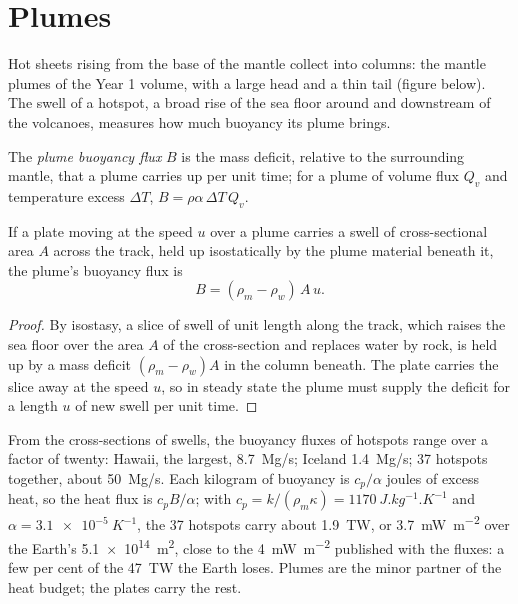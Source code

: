 \section{Plumes}

Hot sheets rising from the base of the mantle collect into columns: the mantle
plumes of the Year 1 volume, with a large head and a thin tail (figure below).
The swell of a hotspot, a broad rise of the sea floor around and downstream of
the volcanoes, measures how much buoyancy its plume brings.

\begin{definition}\label{def:b3:mantle-convection:buoyancy-flux}
The \emph{plume buoyancy flux} $B$ is the mass
deficit, relative to the surrounding mantle, that a plume carries up per unit
time; for a plume of volume flux $Q_v$ and temperature excess $\Delta T$,
$B = \rho\alpha\,\Delta T\,Q_v$.
\end{definition}

\begin{proposition}\label{prop:b3:mantle-convection:swell}
If a plate moving at the speed $u$ over a plume carries a swell of
cross-sectional area $A$ across the track, held up isostatically by the plume
material beneath it, the plume's buoyancy flux is
\[
  B = (\rho_m - \rho_w)\,A\,u .
\]
\end{proposition}

\begin{proof}
By isostasy, a slice of swell of unit length along the track, which raises
the sea floor over the area $A$ of the cross-section and replaces water by
rock, is held up by a mass deficit $(\rho_m - \rho_w)A$ in the column beneath.
The plate carries the slice away at the speed $u$, so in steady state the
plume must supply the deficit for a length $u$ of new swell per unit time.
\end{proof}

From the cross-sections of swells, the buoyancy fluxes of hotspots range over
a factor of twenty: Hawaii, the largest, \qty{8.7}{Mg/s}; Iceland
\qty{1.4}{Mg/s}; 37 hotspots together, about \qty{50}{Mg/s}. Each kilogram of
buoyancy is $c_p/\alpha$ joules of excess heat, so the heat flux is $c_pB/\alpha$;
with $c_p = k/(\rho_m\kappa) = \qty{1170}{J.kg^{-1}.K^{-1}}$ and $\alpha =
\qty{3.1e-5}{K^{-1}}$, the 37 hotspots carry about \qty{1.9}{TW}, or
\qty{3.7}{mW.m^{-2}} over the Earth's \qty{5.1e14}{m^2}, close to the
\qty{4}{mW.m^{-2}} published with the fluxes: a few per cent of the
\qty{47}{TW} the Earth loses. Plumes are the minor partner of the heat
budget; the plates carry the rest.


